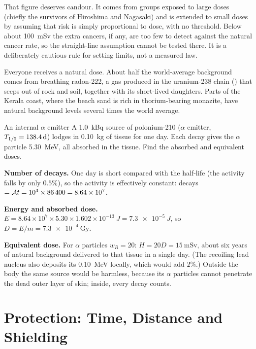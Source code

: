 That figure deserves candour. It comes from groups exposed to large doses (chiefly the survivors of
Hiroshima and Nagasaki) and is extended to small doses by assuming that risk is simply proportional to
dose, with no threshold. Below about \SI{100}{\milli\sievert} the extra cancers, if any, are too few to
detect against the natural cancer rate, so the straight-line assumption cannot be tested there. It is a
deliberately cautious rule for setting limits, not a measured law.

Everyone receives a natural dose. About half the world-average background comes from breathing radon-222,
a gas produced in the uranium-238 chain () that seeps out of rock and soil, together
with its short-lived daughters. Parts of the Kerala coast, where the beach sand is rich in thorium-bearing
monazite, have natural background levels several times the world average.

\begin{exbox}{An internal $\alpha$ emitter}\label{ex:nucapp-po210dose}
A \SI{1.0}{\kilo\becquerel} source of polonium-210 ($\alpha$ emitter, $T_{1/2}=\SI{138.4}{d}$) lodges in
\SI{0.10}{kg} of tissue for one day. Each decay gives the $\alpha$ particle \SI{5.30}{\MeV}, all absorbed
in the tissue. Find the absorbed and equivalent doses.

 \textbf{Number of decays.} One day is short compared with the half-life (the activity falls by
only $0.5\%$), so the activity is effectively constant: decays $=\mathcal{A} t=10^{3}\times86\,400=8.64\times10^{7}$.

 \textbf{Energy and absorbed dose.} $E=8.64\times10^{7}\times5.30\times1.602\times10^{-13}\
\si{J}=\SI{7.3e-5}{J}$, so $D=E/m=\SI{7.3e-4}{\gray}$.

 \textbf{Equivalent dose.} For $\alpha$ particles $w_R=20$: $H=20D=\SI{15}{\milli\sievert}$,
about six years of natural background delivered to that tissue in a single day. (The recoiling lead
nucleus also deposits its \SI{0.10}{\MeV} locally, which would add $2\%$.) Outside the body the same source
would be harmless, because its $\alpha$ particles cannot penetrate the dead outer layer of skin; inside, every
decay counts.
\end{exbox}

\section{Protection: Time, Distance and Shielding}\label{sec:nucapp-shielding}

